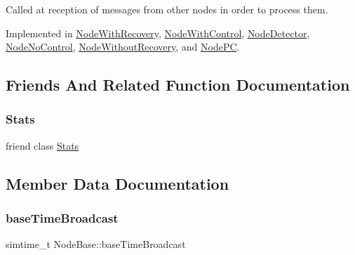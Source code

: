 Called at reception of messages from other nodes in order to process them. 



Implemented in \hyperlink{class_node_with_recovery_a216c29d76ddb0e94cd5701ff208c7f5b}{Node\+With\+Recovery}, \hyperlink{class_node_with_control_af532082fab76c38d8c50ca90e991f4c3}{Node\+With\+Control}, \hyperlink{class_node_detector_ab69432c6d3327a684845ec231826727e}{Node\+Detector}, \hyperlink{class_node_no_control_aa83bc408fe3dab03f124ea5489946836}{Node\+No\+Control}, \hyperlink{class_node_without_recovery_a0b44132b4ebc650399711766cb050399}{Node\+Without\+Recovery}, and \hyperlink{class_node_p_c_aa5fedc4136104a06e2f1131f1ba16b0e}{Node\+PC}.



\subsection{Friends And Related Function Documentation}
\mbox{\label{class_node_base_a129f65b6976377739eb6231b6962985e}} 
\subsubsection{\texorpdfstring{Stats}{Stats}}
{\footnotesize\ttfamily friend class \hyperlink{class_stats}{Stats}\hspace{0.3cm}{\ttfamily [friend]}}



\subsection{Member Data Documentation}
\mbox{\label{class_node_base_a199676fc8bd0203c7241f58779c5921c}} 
\subsubsection{\texorpdfstring{base\+Time\+Broadcast}{baseTimeBroadcast}}
{\footnotesize\ttfamily simtime\+\_\+t Node\+Base\+::base\+Time\+Broadcast\hspace{0.3cm}{\ttfamily [protected]}}



